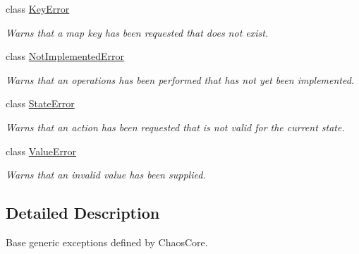\begin{DoxyCompactItemize}
class \hyperlink{classchaos_1_1ex_1_1_key_error}{Key\+Error}
\begin{DoxyCompactList}\small\item\em Warns that a map key has been requested that does not exist. \end{DoxyCompactList}\item 
class \hyperlink{classchaos_1_1ex_1_1_not_implemented_error}{Not\+Implemented\+Error}
\begin{DoxyCompactList}\small\item\em Warns that an operations has been performed that has not yet been implemented. \end{DoxyCompactList}\item 
class \hyperlink{classchaos_1_1ex_1_1_state_error}{State\+Error}
\begin{DoxyCompactList}\small\item\em Warns that an action has been requested that is not valid for the current state. \end{DoxyCompactList}\item 
class \hyperlink{classchaos_1_1ex_1_1_value_error}{Value\+Error}
\begin{DoxyCompactList}\small\item\em Warns that an invalid value has been supplied. \end{DoxyCompactList}\end{DoxyCompactItemize}


\subsection{Detailed Description}
Base generic exceptions defined by Chaos\+Core. 